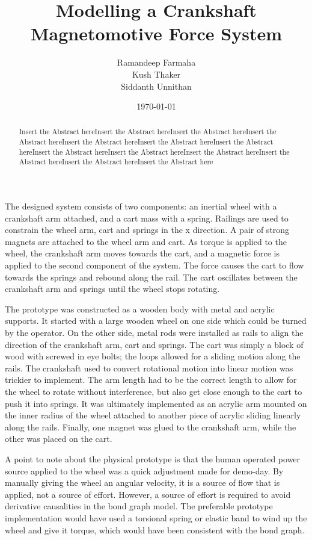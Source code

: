 \documentclass[notitlepage,11pt]{report}
\title{Modelling a Crankshaft Magnetomotive Force System}
\author{Ramandeep Farmaha \\ Kush Thaker \\ Siddanth Unnithan}
\date{\today}
\begin{document}
\maketitle
\thispagestyle{empty}

\begin{abstract}
Insert the Abstract hereInsert the Abstract hereInsert the Abstract hereInsert the Abstract hereInsert the Abstract hereInsert the Abstract hereInsert the Abstract hereInsert the Abstract hereInsert the Abstract hereInsert the Abstract hereInsert the Abstract hereInsert the Abstract hereInsert the Abstract here
\end{abstract}
\begin{multicols}{2}
The designed system consists of two components: an inertial wheel with a crankshaft arm attached, and a cart mass with a spring. Railings are used to constrain the wheel arm, cart and springs in the x direction. A pair of strong magnets are attached to the wheel arm and cart. As torque is applied to the wheel, the crankshaft arm moves towards the cart, and a magnetic force is applied to the second component of the system. The force causes the cart to flow towards the springs and rebound along the rail. The cart oscillates between the crankshaft arm and springs until the wheel stops rotating.

The prototype was constructed as a wooden body with metal and acrylic supports. It started with a large wooden wheel on one side which could be turned by the operator. On the other side, metal rods were installed as rails to align the direction of the crankshaft arm, cart and springs. The cart was simply a block of wood with screwed in eye bolts; the loops allowed for a sliding motion along the rails. The crankshaft used to convert rotational motion into linear motion was trickier to implement. The arm length had to be the correct length to allow for the wheel to rotate without interference, but also get close enough to the cart to push it into springs. It was ultimately implemented as an acrylic arm mounted on the inner radius of the wheel attached to another piece of acrylic sliding linearly along the rails. Finally, one magnet was glued to the crankshaft arm, while the other was placed on the cart.

A point to note about the physical prototype is that the human operated power source applied to the wheel was a quick adjustment made for demo-day. By manually giving the wheel an angular velocity, it is a source of flow that is applied, not a source of effort. However, a source of effort is required to avoid derivative causalities in the bond graph model. The preferable prototype implementation would have used a torsional spring or elastic band to wind up the wheel and give it torque, which would have been consistent with the bond graph.


\end{multicols}
\end{document}
